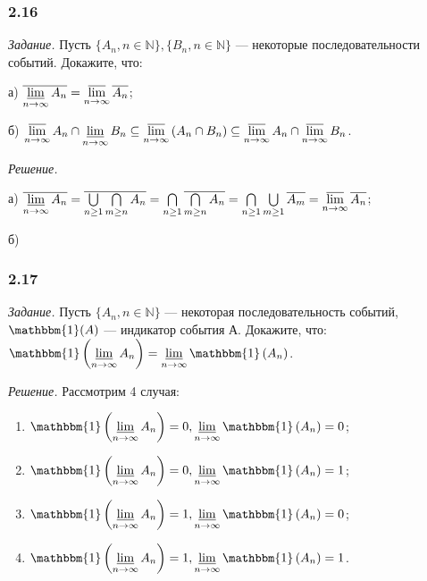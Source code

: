 \documentclass{book}
\begin{document}
\subsubsection*{2.16}

\textit{Задание.} Пусть $\{A_n, n\in\mathbb{N}\}, \{B_n, n\in\mathbb{N}\}$ --- некоторые последовательности событий. Докажите, что:

а) $\overline{\varliminf\limits_{n\to\infty}A_n}=\varlimsup\limits_{n\to\infty}\overline{A_n}$;

б) $\varlimsup\limits_{n\to\infty}A_n\cap\varliminf\limits_{n\to\infty}B_n\subseteq\varlimsup\limits_{n\to\infty}\left(A_n\cap B_n\right)\subseteq\varlimsup\limits_{n\to\infty}A_n\cap\varlimsup\limits_{n\to\infty}B_n$.

\textit{Решение.}

а) $\overline{\varliminf\limits_{n\to\infty}A_n}=\overline{\bigcup\limits_{n\geq 1}\bigcap\limits_{m\geq n}A_n}=\bigcap\limits_{n\geq 1}\overline{\bigcap\limits_{m\geq n}A_n}=\bigcap\limits_{n\geq 1}\bigcup\limits_{m\geq 1}\overline{A_m}=\varlimsup\limits_{n\to\infty}\overline{A_n}$;

б)

\subsubsection*{2.17}

\textit{Задание.} Пусть $\{A_n, n\in\mathbb{N}\}$ --- некоторая последовательность событий, $\mathbbm{1}(A)$ --- индикатор события А. Докажите, что: $\mathbbm{1}\left(\varliminf\limits_{n\to\infty}A_n\right)=\varliminf\limits_{n\to\infty}\mathbbm{1}\left(A_n\right)$.

\textit{Решение.} Рассмотрим 4 случая:
\begin{enumerate}
\item $\mathbbm{1}\left(\varliminf\limits_{n\to\infty}A_n\right)=0, \varliminf\limits_{n\to\infty}\mathbbm{1}\left(A_n\right)=0$;
\item $\mathbbm{1}\left(\varliminf\limits_{n\to\infty}A_n\right)=0, \varliminf\limits_{n\to\infty}\mathbbm{1}\left(A_n\right)=1$;
\item $\mathbbm{1}\left(\varliminf\limits_{n\to\infty}A_n\right)=1, \varliminf\limits_{n\to\infty}\mathbbm{1}\left(A_n\right)=0$;
\item $\mathbbm{1}\left(\varliminf\limits_{n\to\infty}A_n\right)=1, \varliminf\limits_{n\to\infty}\mathbbm{1}\left(A_n\right)=1$.
\end{enumerate}
\end{document}
